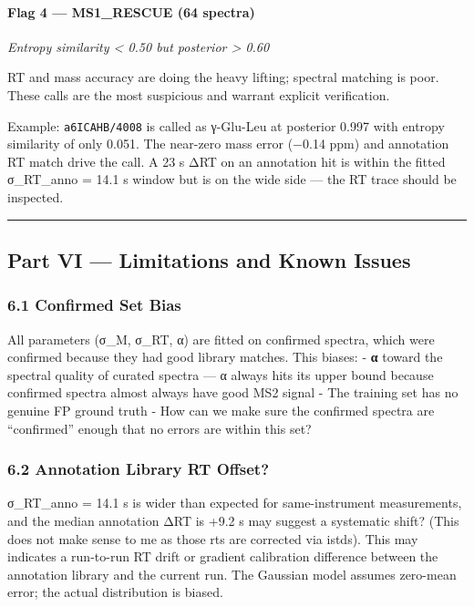 \paragraph{Flag 4 --- MS1\_RESCUE (64
spectra)}\label{flag-4-ms1_rescue-64-spectra}

\emph{Entropy similarity \textless{} 0.50 but posterior \textgreater{}
0.60}

RT and mass accuracy are doing the heavy lifting; spectral matching is
poor. These calls are the most suspicious and warrant explicit
verification.

Example: \texttt{a6ICAHB/4008} is called as γ-Glu-Leu at posterior 0.997
with entropy similarity of only 0.051. The near-zero mass error (−0.14
ppm) and annotation RT match drive the call. A 23 s ΔRT on an annotation
hit is within the fitted σ\_RT\_anno = 14.1 s window but is on the wide
side --- the RT trace should be inspected.

\begin{center}\rule{0.5\linewidth}{0.5pt}\end{center}

\subsection{Part VI --- Limitations and Known
Issues}\label{part-vi-limitations-and-known-issues}

\subsubsection{6.1 Confirmed Set Bias}\label{confirmed-set-bias}

All parameters (σ\_M, σ\_RT, α) are fitted on confirmed spectra, which
were confirmed because they had good library matches. This biases: -
\textbf{α} toward the spectral quality of curated spectra --- α always
hits its upper bound because confirmed spectra almost always have good
MS2 signal - The training set has no genuine FP ground truth - How can
we make sure the confirmed spectra are ``confirmed'' enough that no
errors are within this set?

\subsubsection{6.2 Annotation Library RT
Offset?}\label{annotation-library-rt-offset}

σ\_RT\_anno = 14.1 s is wider than expected for same-instrument
measurements, and the median annotation ΔRT is +9.2 s may suggest a
systematic shift? (This does not make sense to me as those rts are
corrected via istds). This may indicates a run-to-run RT drift or
gradient calibration difference between the annotation library and the
current run. The Gaussian model assumes zero-mean error; the actual
distribution is biased.

